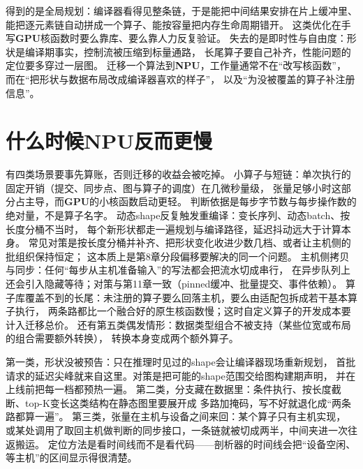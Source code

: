 \documentclass[12pt,a4paper,fontset=fandol]{ctexbook}
\newcommand{\Dom}[1]{\textsf{\bfseries #1}}
\newcommand{\GPU}{\Dom{GPU}}
\newcommand{\NPU}{\Dom{NPU}}
\begin{document}
\begin{compare}[title={图编译优先带来的得与失}]
得到的是全局规划：编译器看得见整条链，于是能把中间结果安排在片上缓冲里、
能把逐元素链自动拼成一个算子、能按容量把内存生命周期错开。
这类优化在手写\GPU{}核函数时要么靠库、要么靠人力反复验证。
失去的是即时性与自由度：形状是编译期事实，控制流被压缩到标量通路，
长尾算子要自己补齐，性能问题的定位要多穿过一层图。
迁移一个算法到\NPU{}，工作量通常不在``改写核函数''，
而在``把形状与数据布局改成编译器喜欢的样子''，
以及``为没被覆盖的算子补注册信息''。
\end{compare}

\section{什么时候NPU反而更慢}

有四类场景要事先算账，否则迁移的收益会被吃掉。
小算子与短链：单次执行的固定开销（提交、同步点、图与算子的调度）在几微秒量级，
张量足够小时这部分占主导，而\GPU{}的小核函数启动更轻。
判断依据是每步字节数与每步操作数的绝对量，不是算子名字。
动态shape反复触发重编译：变长序列、动态batch、按长度分桶不当时，
每个新形状都走一遍规划与编译路径，延迟抖动远大于计算本身。
常见对策是按长度分桶并补齐、把形状变化收进少数几档、或者让主机侧的批组织保持恒定；
这本质上是第8章分段偏移要解决的同一个问题。
主机侧拷贝与同步：任何``每步从主机准备输入''的写法都会把流水切成串行，
在异步队列上还会引入隐藏等待；对策与第11章一致（pinned缓冲、批量提交、事件依赖）。
算子库覆盖不到的长尾：未注册的算子要么回落主机，要么由适配包拆成若干基本算子执行，
两条路都比一个融合好的原生核函数慢；这时自定义算子的开发成本要计入迁移总价。
还有第五类偶发情形：数据类型组合不被支持（某些位宽或布局的组合需要额外转换），
转换本身变成两个额外算子。

\begin{warning}[title={静态图与动态shape的三类翻车}]
第一类，形状没被预告：只在推理时见过的shape会让编译器现场重新规划，
首批请求的延迟尖峰就来自这里。对策是把可能的shape范围交给图构建期声明，
并在上线前把每一档都预热一遍。
第二类，分支藏在数据里：条件执行、按长度截断、top-K变长这类结构在静态图里要展开成
多路加掩码，写不好就退化成``两条路都算一遍''。
第三类，张量在主机与设备之间来回：某个算子只有主机实现，
或某处调用了取回主机做判断的同步接口，一条链就被切成两半，中间夹进一次往返搬运。
定位方法是看时间线而不是看代码——剖析器的时间线会把``设备空闲、等主机''的区间显示得很清楚。
\end{warning}
\end{document}
